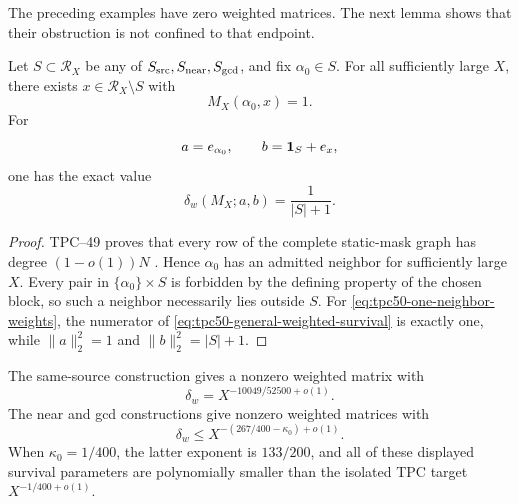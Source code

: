 The preceding examples have zero weighted matrices.  The next lemma
shows that their obstruction is not confined to that endpoint.

\begin{lemma}
\label{lem:tpc50-admitted-neighbor}
Let \(S\subset\mathcal R_X\) be any of
\(S_{\rm src},S_{\rm near},S_{\rm gcd}\), and fix
\(\alpha_0\in S\).  For all sufficiently large \(X\), there exists
\(x\in\mathcal R_X\setminus S\) with
\begin{equation}
 M_X(\alpha_0,x)=1.
 \label{eq:tpc50-admitted-neighbor}
\end{equation}
For
\begin{equation}
 a=e_{\alpha_0},
 \qquad
 b=\mathbf 1_S+e_x,
 \label{eq:tpc50-one-neighbor-weights}
\end{equation}
one has the exact value
\begin{equation}
 \boxed{
 \delta_w(M_X;a,b)=\frac1{|S|+1}.}
 \label{eq:tpc50-one-neighbor-survival}
\end{equation}
\end{lemma}

\begin{proof}
TPC--49 proves that every row of the complete static-mask graph has
degree \((1-o(1))N\) \citep{WangTPC49}.  Hence \(\alpha_0\) has an
admitted neighbor for sufficiently large \(X\).  Every pair in
\(\{\alpha_0\}\times S\) is forbidden by the defining property of the
chosen block, so such a neighbor necessarily lies outside \(S\).
For \eqref{eq:tpc50-one-neighbor-weights}, the numerator of
\eqref{eq:tpc50-general-weighted-survival} is exactly one, while
\(\|a\|_2^2=1\) and \(\|b\|_2^2=|S|+1\).
\end{proof}

\begin{corollary}
\label{cor:tpc50-tiny-positive-survival}
The same-source construction gives a nonzero weighted matrix with
\begin{equation}
 \delta_w
 =X^{-10049/52500+o(1)}.
 \label{eq:tpc50-source-tiny-endpoint}
\end{equation}
The near and gcd constructions give nonzero weighted matrices with
\begin{equation}
 \delta_w
 \le X^{-(267/400-\kappa_0)+o(1)}.
 \label{eq:tpc50-near-gcd-tiny-endpoint}
\end{equation}
When \(\kappa_0=1/400\), the latter exponent is \(133/200\), and all of
these displayed survival parameters are polynomially smaller than the
isolated TPC target \(X^{-1/400+o(1)}\).
\end{corollary}


